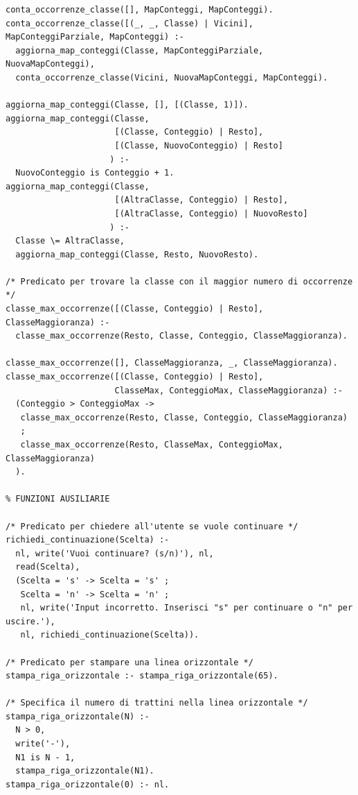 \documentclass[11pt]{article}
\theoremstyle{definition}
\begin{document}
\begin{verbatim}
conta_occorrenze_classe([], MapConteggi, MapConteggi).
conta_occorrenze_classe([(_, _, Classe) | Vicini], MapConteggiParziale, MapConteggi) :-
  aggiorna_map_conteggi(Classe, MapConteggiParziale, NuovaMapConteggi),
  conta_occorrenze_classe(Vicini, NuovaMapConteggi, MapConteggi).

aggiorna_map_conteggi(Classe, [], [(Classe, 1)]).
aggiorna_map_conteggi(Classe, 
                      [(Classe, Conteggio) | Resto], 
                      [(Classe, NuovoConteggio) | Resto]
                     ) :-
  NuovoConteggio is Conteggio + 1.
aggiorna_map_conteggi(Classe, 
                      [(AltraClasse, Conteggio) | Resto], 
                      [(AltraClasse, Conteggio) | NuovoResto]
                     ) :-
  Classe \= AltraClasse,
  aggiorna_map_conteggi(Classe, Resto, NuovoResto).

/* Predicato per trovare la classe con il maggior numero di occorrenze */
classe_max_occorrenze([(Classe, Conteggio) | Resto], ClasseMaggioranza) :-
  classe_max_occorrenze(Resto, Classe, Conteggio, ClasseMaggioranza).

classe_max_occorrenze([], ClasseMaggioranza, _, ClasseMaggioranza).
classe_max_occorrenze([(Classe, Conteggio) | Resto], 
                      ClasseMax, ConteggioMax, ClasseMaggioranza) :-
  (Conteggio > ConteggioMax ->
   classe_max_occorrenze(Resto, Classe, Conteggio, ClasseMaggioranza)
   ;  
   classe_max_occorrenze(Resto, ClasseMax, ConteggioMax, ClasseMaggioranza)
  ).
	
% FUNZIONI AUSILIARIE	
	
/* Predicato per chiedere all'utente se vuole continuare */
richiedi_continuazione(Scelta) :-
  nl, write('Vuoi continuare? (s/n)'), nl,
  read(Scelta),
  (Scelta = 's' -> Scelta = 's' ;
   Scelta = 'n' -> Scelta = 'n' ;
   nl, write('Input incorretto. Inserisci "s" per continuare o "n" per uscire.'), 
   nl, richiedi_continuazione(Scelta)).

/* Predicato per stampare una linea orizzontale */
stampa_riga_orizzontale :- stampa_riga_orizzontale(65).

/* Specifica il numero di trattini nella linea orizzontale */
stampa_riga_orizzontale(N) :- 
  N > 0, 
  write('-'), 
  N1 is N - 1, 
  stampa_riga_orizzontale(N1).
stampa_riga_orizzontale(0) :- nl.

\end{verbatim}

\newpage
\end{document}

